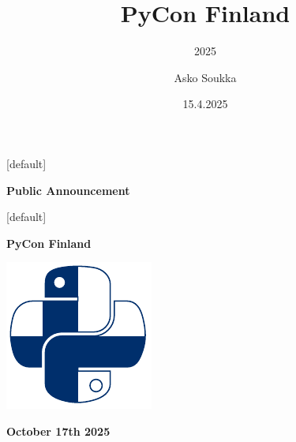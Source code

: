 \documentclass[12pt,aspectratio=169]{beamer}
\title{PyCon Finland}
\subtitle{2025}
\date{15.4.2025}
\author{Asko Soukka}
\begin{document}

[default]
\begin{frame}
\vfill
\centering \huge \textbf{Public Announcement}
\vfill
\end{frame}


{
\begin{frame}[plain]
\end{frame}
}


[default]
\begin{frame}
\vfill
\centering \huge \textbf{PyCon Finland}
\par
\centering \includegraphics[height=0.50\paperheight]{images/PyCon-Finland.pdf}
\par
\textbf{October 17th 2025}
\vfill
\end{frame}
\end{document}
